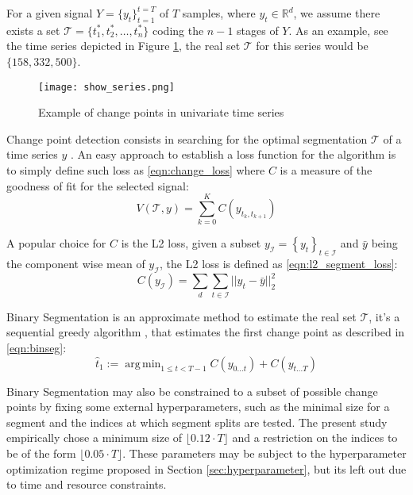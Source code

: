 \documentclass{IEEEtran}
\DeclareMathOperator*{\argmin}{arg\,min}
\begin{document}
                For a given signal $Y = \{y_t\}_{t=1}^{t=T}$ of $T$ samples, where $y_t \in \mathbb{R}^d$, we assume there exists a set $\mathcal{T} = \{t_{1}^{*}, t_{2}^{*}, \dots, t_{n}^{*}\}$ coding the $n-1$ stages of $Y$. As an example, see the time series depicted in Figure \ref{fig:changepoint_example}, the real set $\mathcal{T}$ for this series would be $\{158, 332, 500\}$.
                \begin{figure}[!htbp]
                    \centering
                    \texttt{[image: show\_series.png]}
                    \caption{Example of change points in univariate time series}
                    \label{fig:changepoint_example}
                \end{figure}

                Change point detection consists in searching for the optimal segmentation $\mathcal{T}$ of a time series $y$ \cite{truong2020selective}. An easy approach to establish a loss function for the algorithm is to simply define such loss as \eqref{eqn:change_loss} where $C$ is a measure of the goodness of fit for the selected signal:
                \begin{equation}\label{eqn:change_loss}
                    V(\mathcal{T}, y) = \sum_{k=0}^{K} C(y_{t_k, t_{k+1}})
                \end{equation}

                A popular choice for $C$ is the L2 loss, given a subset $y_\mathcal{I} = \left\{y_t\right\}_{t \in \mathcal{I}}$ and $\bar{y}$ being the component wise mean of $y_{\mathcal{I}}$, the L2 loss is defined as \eqref{eqn:l2_segment_loss}:
                \begin{equation}\label{eqn:l2_segment_loss}
                    C(y_{\mathcal{I}}) = \sum_{d} \sum_{t \in \mathcal{I}} ||y_t - \bar{y} ||_{2}^{2}
                \end{equation}

                Binary Segmentation is an approximate method to estimate the real set $\mathcal{T}$, it's a sequential greedy algorithm \cite{truong2020selective}, \cite{jiang2023time} that estimates the first change point as described in \eqref{eqn:binseg}:
                \begin{equation} \label{eqn:binseg}
                    \hat{t}_{1} := \argmin_{1 \leq t < T - 1} C(y_{0 \dots t}) + C(y_{t \dots T})
                \end{equation}

                Binary Segmentation may also be constrained to a subset of possible change points by fixing some external hyperparameters, such as the minimal size for a segment and the indices at which segment splits are tested. The present study empirically chose a minimum size of $\lfloor 0.12 \cdot T\rfloor$ and a restriction on the indices to be of the form $\lfloor 0.05 \cdot T \rfloor$. These parameters may be subject to the hyperparameter optimization regime proposed in Section \ref{sec:hyperparameter}, but its left out due to time and resource constraints.
\end{document}
